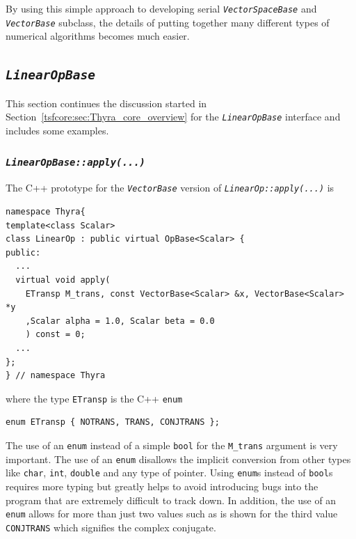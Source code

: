 \documentclass[pdf,ps2pdf,11pt]{SANDreport}
\begin{document}
By using this simple approach to developing serial
{}\texttt{\textit{Vector\-Space\-Base}} and {}\texttt{\textit{Vector\-Base}}
subclass, the details of putting together many different types of
numerical algorithms becomes much easier.

%
\subsection{\texttt{\textit{Linear\-Op\-Base}}}
\label{tsfcore:sec:linear_op}
%

This section continues the discussion started in
Section~\ref{tsfcore:sec:Thyra_core_overview} for the
{}\texttt{\textit{Linear\-Op\-Base}} interface and includes some examples.

%
\subsubsection{\texttt{\textit{LinearOpBase::apply(\-...)}}}
\label{tsfcore:sec:linear_op_apply}
%

The C++ prototype for the {}\texttt{\textit{Vector\-Base}} version of
{}\texttt{\textit{LinearOp\-::apply(\-...)}} is

{\scriptsize\begin{verbatim}
namespace Thyra{
template<class Scalar>
class LinearOp : public virtual OpBase<Scalar> {
public:
  ...
  virtual void apply(
    ETransp M_trans, const VectorBase<Scalar> &x, VectorBase<Scalar> *y
    ,Scalar alpha = 1.0, Scalar beta = 0.0
    ) const = 0;
  ...
};
} // namespace Thyra
\end{verbatim}}

{}\noindent{}where the type {}\texttt{ETransp} is the C++
{}\texttt{enum}

{\scriptsize\begin{verbatim}
enum ETransp { NOTRANS, TRANS, CONJTRANS };
\end{verbatim}}

{}\noindent{}The use of an {}\texttt{enum} instead of a simple
{}\texttt{bool} for the {}\texttt{M\_trans} argument is very
important.  The use of an {}\texttt{enum} disallows the implicit
conversion from other types like {}\texttt{char}, {}\texttt{int},
{}\texttt{double} and any type of pointer.  Using {}\texttt{enum}s
instead of {}\texttt{bool}s requires more typing but greatly helps to
avoid introducing bugs into the program that are extremely difficult
to track down.  In addition, the use of an {}\texttt{enum} allows for
more than just two values such as is shown for the third value
{}\texttt{CONJTRANS} which signifies the complex conjugate.
\end{document}
